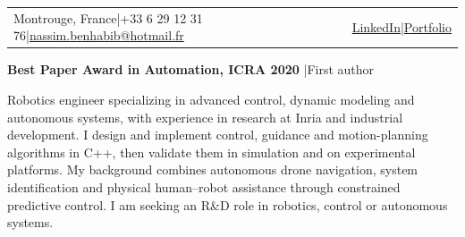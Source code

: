 \documentclass[10pt,a4paper]{article}
\newcommand{\cvsection}[1]{\par\vspace{6pt}{\color{blue}\bfseries\fontsize{9}{11}\selectfont\MakeUppercase{#1}}\par\vspace{2pt}{\color{rule}\hrule height .6pt}\vspace{3pt}}
\begin{document}
\color{navy}

\noindent\colorbox{navy}{\begin{minipage}[t]{\dimexpr\linewidth-2\fboxsep\relax}
\vspace{8pt}\par
\vspace{4pt}\par
\vspace{3pt}\vspace{9pt}
\end{minipage}}\par
\vspace{8pt}
\begin{tabularx}{\linewidth}{@{}X r@{}}
{\small Montrouge, France\quad\textcolor{rule}{|}\quad +33 6 29 12 31 76\quad\textcolor{rule}{|}\quad\href{mailto:nassim.benhabib@hotmail.fr}{nassim.benhabib@hotmail.fr}} &
{\small\color{blue}\href{https://www.linkedin.com/in/nassim-benhabib-a44a7013b}{LinkedIn}\quad\textcolor{rule}{|}\quad\href{https://nassimbenhabib.github.io/}{Portfolio}}
\end{tabularx}
\vspace{5pt}
{\small\color{blue}\bfseries Best Paper Award in Automation, ICRA 2020}
{\small\color{muted}\quad|\quad First author}\par

\cvsection{Profile}
{\small\setlength{\baselineskip}{13pt}
Robotics engineer specializing in advanced control, dynamic modeling and autonomous systems, with experience in research at Inria and industrial development. I design and implement control, guidance and motion-planning algorithms in C++, then validate them in simulation and on experimental platforms. My background combines autonomous drone navigation, system identification and physical human--robot assistance through constrained predictive control. I am seeking an R\&D role in robotics, control or autonomous systems.\par}
\end{document}
